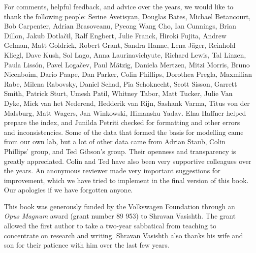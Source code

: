 For comments, helpful feedback, and advice over the years, we would like to thank the following people: 
Serine Avetisyan,
Douglas Bates, 
Michael Betancourt, 
Bob Carpenter, 
Adrian Brasoveanu, 
Pyeong Wang Cho,
Ian Cunnings,
Brian Dillon,
Jakub Dotla\v cil,
Ralf Engbert, 
Julie Franck,
Hiroki Fujita, 
Andrew Gelman, 
Matt Goldrick,
Robert Grant,
Sandra Hanne,
Lena J\"ager,
Reinhold Kliegl, 
Dave Kush,
Sol Lago,
Anna Laurinavichyute,
Richard Lewis, 
Tal Linzen, 
Paula Liss\'on,
Pavel Loga{\v c}ev,
Paul M\"atzig,
Daniela Mertzen,
Mitzi Morris, 
Bruno Nicenboim,
Dario Paape,
Dan Parker,
Colin Phillips,
Dorothea Pregla,
Maxmilian Rabe, 
Milena Rabovsky, 
Daniel Schad,
Pia  Schoknecht, 
Scott Sisson, 
Garrett Smith,
Patrick Sturt,
Umesh Patil,
Whitney Tabor,
Matt Tucker,
Julie Van Dyke,
Mick van het Nederend,
Hedderik van Rijn,
Sashank Varma, 
Titus von der Malsburg,
Matt Wagers,
Jan Winkowski,
Himanshu Yadav. Elna Haffner helped prepare the index, and Junilda Petriti checked for formatting and other errors and inconsistencies. 
Some of the data that formed the basis for modelling came from our own lab, but a lot of other data came from Adrian Staub, Colin Phillips' group, and Ted Gibson's group. Their openness and transparency is greatly appreciated. Colin and Ted have also been very supportive colleagues over the years. An anonymous reviewer made very important suggestions for improvement, which we have tried to implement in the final version of this book. Our apologies if we have forgotten anyone.

This book was generously funded by the Volkswagen Foundation through an \textit{Opus Magnum} award (grant number 89 953) to Shravan Vasishth. The grant  allowed the first author to take a two-year sabbatical from teaching to concentrate on research and writing. Shravan Vasishth also thanks his wife and son for their patience  with him over the last few years.
